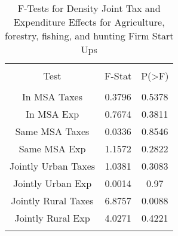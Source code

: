 
\begin{table}[!htbp] \centering 
  \caption{F-Tests for Density Joint Tax and Expenditure Effects for Agriculture, forestry, fishing, and hunting Firm Start Ups} 
  \label{11Ftests} 
\begin{tabular}{@{\extracolsep{5pt}} ccc} 
\\[-1.8ex]\hline 
\hline \\[-1.8ex] 
Test & F-Stat & P(\textgreater F) \\ 
\hline \\[-1.8ex] 
In MSA Taxes & 0.3796 & 0.5378 \\ 
In MSA Exp & 0.7674 & 0.3811 \\ 
Same MSA Taxes & 0.0336 & 0.8546 \\ 
Same MSA Exp & 1.1572 & 0.2822 \\ 
Jointly Urban Taxes & 1.0381 & 0.3083 \\ 
Jointly Urban Exp & 0.0014 & 0.97 \\ 
Jointly Rural Taxes & 6.8757 & 0.0088 \\ 
Jointly Rural Exp & 4.0271 & 0.4221 \\ 
\hline \\[-1.8ex] 
\end{tabular} 
\end{table} 
